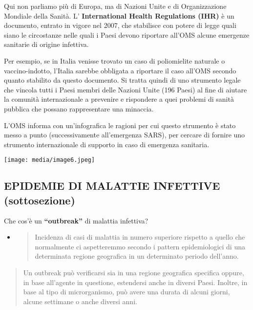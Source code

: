 \documentclass[]{article}
\begin{document}
Qui non parliamo più di Europa, ma di Nazioni Unite e di Organizzazione
Mondiale della Sanità. L' \textbf{International Health Regulations
(IHR)} è un documento, entrato in vigore nel 2007, che stabilisce con
potere di legge quali siano le circostanze nelle quali i Paesi devono
riportare all'OMS alcune emergenze sanitarie di origine infettiva.

Per esempio, se in Italia venisse trovato un caso di poliomielite
naturale o vaccino-indotto, l'Italia sarebbe obbligata a riportare il
caso all'OMS secondo quanto stabilito da questo documento. Si tratta
quindi di uno strumento legale che vincola tutti i Paesi membri delle
Nazioni Unite (196 Paesi) al fine di aiutare la comunità internazionale
a prevenire e rispondere a quei problemi di sanità pubblica che possano
rappresentare una minaccia.

L'OMS informa con un'infografica le ragioni per cui questo strumento è
stato messo a punto (successivamente all'emergenza SARS), per cercare di
fornire uno strumento internazionale di supporto in caso di emergenza
sanitaria.

\texttt{[image: media/image6.jpeg]}

\subsection{}\label{section-1}

\subsection{EPIDEMIE DI MALATTIE INFETTIVE
(sottosezione)}\label{epidemie-di-malattie-infettive-sottosezione}

Che cos'è un \textbf{``outbreak''} di malattia infettiva?

\begin{itemize}
\item
  \begin{quote}
  Incidenza di casi di malattia in numero superiore rispetto a quello
  che normalmente ci aspetteremmo secondo i pattern epidemiologici di
  una determinata regione geografica in un determinato periodo
  dell'anno.
  \end{quote}
\end{itemize}

\begin{quote}
Un outbreak può verificarsi sia in una regione geografica specifica
oppure, in base all'agente in questione, estendersi anche in diversi
Paesi. Inoltre, in base al tipo di microrganismo, può avere una durata
di alcuni giorni, alcune settimane o anche diversi anni.
\end{quote}
\end{document}
